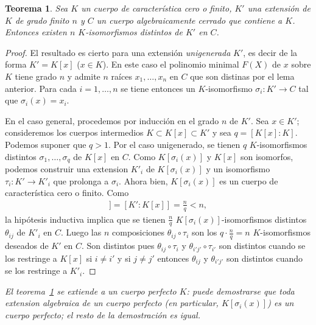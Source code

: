 \documentclass[10pt,oneside,bibtotoc,smallheadings,leqno,a5paper,DIV=12]{scrbook}
\newcommand{\QED}{}%
\renewcommand{\to}[1][]{\xrightarrow{#1}}
\numberwithin{equation}{section}
\newenvironment{comm}%
	{\begin{trivlist}\item\small\itshape}
	{\end{trivlist}}
\theoremstyle{defi}
\theoremstyle{enonce}
\newtheorem{theorem}{Teorema}
\theoremstyle{rem}
\numberwithin{theorem}{section}
\numberwithin{proposition}{section}
\numberwithin{definition}{section}
\numberwithin{lemma}{section}
\numberwithin{corollary}{section}
\numberwithin{example}{section}
\numberwithin{footnote}{section}%
\begin{document}
\begin{theorem}\label{teo2.4.1}
Sea $K$ un cuerpo de caracter\'istica cero o finito, $K'$ una extensi\'on de $K$ de grado finito $n$
y $C$ un cuerpo algebraicamente cerrado que contiene a $K$. Entonces existen $n$ $K$-isomorfismos distintos
de $K'$ en $C$.
\end{theorem}

\begin{proof}
El resultado es cierto para una extensi\'on {\em unigenerada} $K'$, es decir de la forma $K' = K[x]$
($x\in K$). En este caso el polinomio minimal $F(X)$ de $x$ sobre $K$ tiene grado $n$ y admite
$n$ ra\'ices $x_{1},\dots, x_{n}$ en $C$ que son distinas por el lema anterior. Para cada $i=1,\dots,n$ se
tiene entonces un $K$-isomorfismo $\sigma_{i}:K'\to C$ tal que $\sigma_{i}(x) = x_{i}$.

En el caso general, procedemos por inducci\'on en el grado $n$ de $K'$. Sea $x\in K'$; consideremos los cuerpos
intermedios $K\subset K[x]\subset K'$ y sea $q = [K[x]:K]$. Podemos suponer que $q > 1$. Por el caso unigenerado,
se tienen $q$ $K$-isomorfismos distintos $\sigma_{1},\dots,\sigma_{q}$ de $K[x]$ en $C$. Como
$K[\sigma_{i}(x)]$ y $K[x]$ son isomorfos, podemos construir una extension $K'_{i}$ de $K[\sigma_{i}(x)]$
y un isomorfismo $\tau_{i}:K'\to K'_{i}$ que prolonga a $\sigma_{i}$. Ahora bien, $K[\sigma_{i}(x)]$
es un cuerpo de caracter\'istica cero o finito. Como
\begin{gather*}
[K'_{i}:K[\sigma_{i}(x)]] = [K':K[x]] = \frac{n}{q} < n,
\end{gather*}
la hip\'otesis inductiva implica que se tienen $\frac{n}{q}$ $K[\sigma_{i}(x)]$-isomorfismos distintos
$\theta_{ij}$ de $K'_{i}$ en $C$. Luego las $n$ composiciones $\theta_{ij}\circ\tau_{i}$ son los
$q\cdot\frac{n}{q} = n$ $K$-isomorfismos deseados de $K'$ en $C$. Son distintos pues
$\theta_{ij}\circ\tau_{i}$ y $\theta_{i'j'}\circ\tau_{i'}$ son distintos cuando se los restringe a
$K[x]$ si $i\neq i'$ y si $j\neq j'$ entonces $\theta_{ij}$ y $\theta_{i'j'}$ son distintos cuando
se los restringe a $K'_{i}$. \QED
\end{proof}

\begin{comm}
El teorema~\ref{teo2.4.1} se extiende a un cuerpo perfecto $K$: puede demostrarse que
toda extension algebraica de
un cuerpo perfecto (en particular, $K[\sigma_{i}(x)]$) es un cuerpo perfecto; el resto de
la demostraci\'on es igual.
\end{comm}
\end{document}
